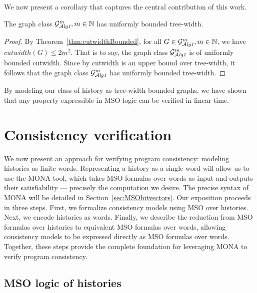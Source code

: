 \documentclass[12pt]{article}
\begin{document}
We now present a corollary that captures the central contribution of this work.

\begin{corollary}\label{theorem:graphTWbounded}
The graph class $\mathcal{G}_{\mathcal{A}\emph{lg1}}^m,m\in\mathbb{N}$ has uniformly bounded tree-width.
\end{corollary}
\begin{proof}
By Theorem~\ref{thm:cutwidthBounded}, for all \mbox{$G\in\mathcal{G}_{\mathcal{A}\emph{lg1}}^m,m\in\mathbb{N}$}, we have $cutwidth(G)\leq 2m^2$. That is to say, the graph class $\mathcal{G}_{\mathcal{A}\emph{lg1}}^m$ is of uniformly bounded cutwidth. Since by  cutwidth is an upper bound over tree-width, it follows that the graph class $\mathcal{G}_{\mathcal{A}\emph{lg1}}^m$ has uniformly bounded tree-width.
\end{proof}
%
%
%



By modeling our class of history as tree-width bounded graphs, we have shown that any property expressible in MSO logic can be verified in linear time.

\section{Consistency verification}


We now present an approach for verifying program consistency: modeling histories as finite words. Representing a history as a single word will allow us to use the MONA tool, which takes MSO formulas over words as input and outputs their satisfiability --- precisely the computation we desire. The precise syntax of MONA will be detailed in Section~\ref{sec:MSObitvectors}.
Our exposition proceeds in three steps. First, we formalize consistency models using MSO over histories. Next, we encode histories as words. Finally, we describe the reduction from MSO formulas over histories to equivalent MSO formulas over words, allowing consistency models to be expressed directly as MSO formulas over words. Together, these steps provide the complete foundation for leveraging MONA to verify program consistency.

\vspace{1em}

\subsection{MSO logic of histories}
\end{document}
